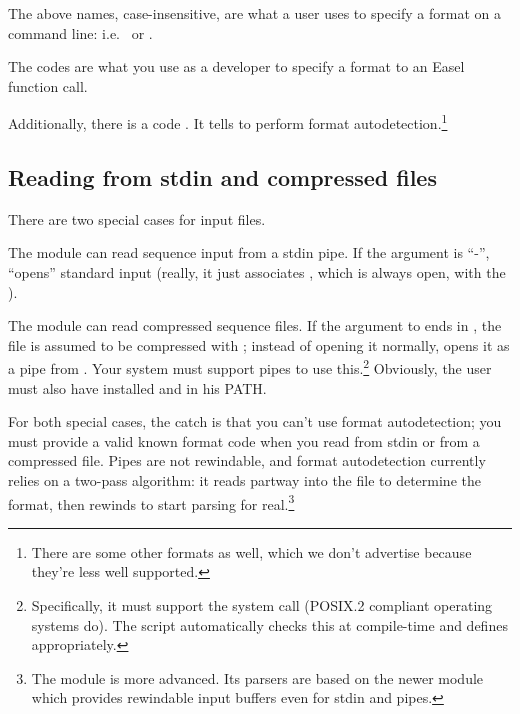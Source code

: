 The above names, case-insensitive, are what a user uses to specify a
format on a command line: i.e.\  or
.

The codes are what you use as a developer to specify a format to an
Easel function call.

Additionally, there is a code . It
tells  to perform format
autodetection.\footnote{There are some other formats as well, which we
  don't advertise because they're less well supported.}


\subsection{Reading from stdin and compressed files}

There are two special cases for input files. 

The module can read sequence input from a stdin pipe. If the
 argument is ``-'',  ``opens''
standard input (really, it just associates , which is
always open, with the ). 

The module can read compressed sequence files. If the 
argument to  ends in , the file
is assumed to be compressed with ; instead of opening it
normally,  opens it as a pipe from
. Your system must support pipes to use
this.\footnote{Specifically, it must support the 
  system call (POSIX.2 compliant operating systems do). The
   script automatically checks this at compile-time
  and defines  appropriately.} Obviously, the user
must also have  installed and in his PATH.

For both special cases, the catch is that you can't use format
autodetection; you must provide a valid known format code when you
read from stdin or from a compressed file. Pipes are not rewindable,
and format autodetection currently relies on a two-pass algorithm: it
reads partway into the file to determine the format, then rewinds to
start parsing for real.\footnote{The  module is more
  advanced. Its parsers are based on the newer  module
  which provides rewindable input buffers even for stdin and pipes.}



